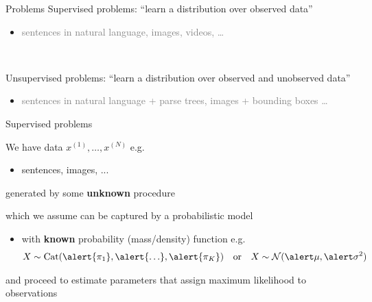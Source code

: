 \documentclass[14pt]{beamer}
\begin{document}
\begin{frame}{Problems}
Supervised problems: \alert{``learn a distribution over observed data''}
\begin{itemize}
	\item \textcolor{gray}{sentences in natural language, images, videos, \ldots}
\end{itemize}

~

Unsupervised problems: \alert{``learn a distribution over observed and unobserved data''}
\begin{itemize}
	\item \textcolor{gray}{sentences in natural language + parse trees, images + bounding boxes \ldots}
\end{itemize}


\end{frame}



\begin{frame}{Supervised problems}

\small

We have data $x^{(1)}, \ldots, x^{(N)}$ e.g.  \\
\begin{itemize}
	\item sentences, images, ...
\end{itemize}
generated by some {\bf unknown} procedure

\pause

which we assume can be captured by a probabilistic model



\begin{itemize}
	\item with {\bf known} probability (mass/density) function e.g.
	\begin{align*}
    X \sim \Cat(\alert{\pi_1}, \alert{\ldots}, \alert{\pi_K}) & & \text{or} & & X \sim \mathcal N(\alert\mu, \alert\sigma^2)
    \end{align*}    
\end{itemize}
\pause
and proceed to \alert{estimate parameters} that assign maximum likelihood to observations

\end{frame}
\end{document}
